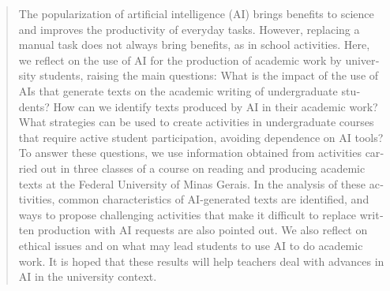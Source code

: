 \documentclass[portuguese]{textolivre}
\begin{document}
\begin{polyabstract}
\begin{english}
\begin{abstract}
The popularization of artificial intelligence (AI) brings benefits to science and improves the productivity of everyday tasks. However, replacing a manual task does not always bring benefits, as in school activities. Here, we reflect on the use of AI for the production of academic work by university students, raising the main questions: What is the impact of the use of AIs that generate texts on the academic writing of undergraduate students? How can we identify texts produced by AI in their academic work? What strategies can be used to create activities in undergraduate courses that require active student participation, avoiding dependence on AI tools? To answer these questions, we use information obtained from activities carried out in three classes of a course on reading and producing academic texts at the Federal University of Minas Gerais. In the analysis of these activities, common characteristics of AI-generated texts are identified, and ways to propose challenging activities that make it difficult to replace written production with AI requests are also pointed out. We also reflect on ethical issues and on what may lead students to use AI to do academic work. It is hoped that these results will help teachers deal with advances in AI in the university context.


\end{abstract}
\end{english}
\end{polyabstract}
\end{document}

